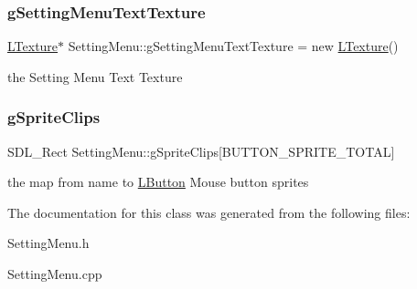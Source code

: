 \subsubsection{\texorpdfstring{g\+Setting\+Menu\+Text\+Texture}{gSettingMenuTextTexture}}
{\footnotesize\ttfamily \mbox{\hyperlink{class_l_texture}{L\+Texture}}$\ast$ Setting\+Menu\+::g\+Setting\+Menu\+Text\+Texture = new \mbox{\hyperlink{class_l_texture}{L\+Texture}}()\hspace{0.3cm}{\ttfamily [private]}}

the Setting Menu Text Texture \mbox{\label{class_setting_menu_ab195bf7620da5060ef399757bd68dfe1}} 
\subsubsection{\texorpdfstring{g\+Sprite\+Clips}{gSpriteClips}}
{\footnotesize\ttfamily S\+D\+L\+\_\+\+Rect Setting\+Menu\+::g\+Sprite\+Clips\mbox{[}B\+U\+T\+T\+O\+N\+\_\+\+S\+P\+R\+I\+T\+E\+\_\+\+T\+O\+T\+AL\mbox{]}\hspace{0.3cm}{\ttfamily [private]}}

the map from name to \mbox{\hyperlink{class_l_button}{L\+Button}} Mouse button sprites 

The documentation for this class was generated from the following files\+:\begin{DoxyCompactItemize}
\item 
Setting\+Menu.\+h\item 
Setting\+Menu.\+cpp\end{DoxyCompactItemize}
